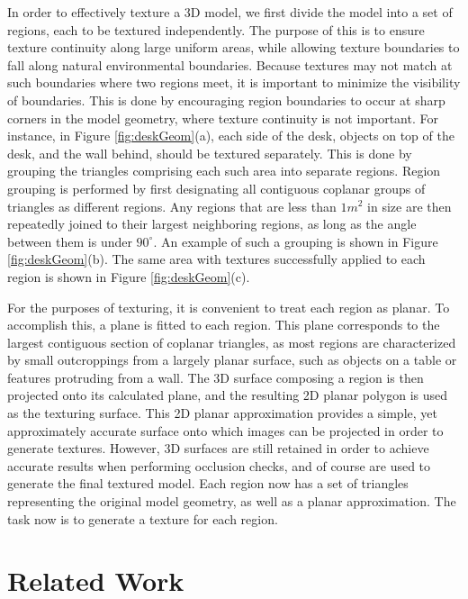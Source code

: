 \documentclass[]{spie}  %
\begin{document}
In order to effectively texture a 3D model, we first divide the model
into a set of regions, each to be textured independently. The purpose
of this is to ensure texture continuity along large uniform areas,
while allowing texture boundaries to fall along natural environmental
boundaries. Because textures may not match at such boundaries where
two regions meet, it is important to minimize the visibility of
boundaries. This is done by encouraging region boundaries to occur at
sharp corners in the model geometry, where texture continuity is not
important. For instance, in Figure \ref{fig:deskGeom}(a), each side of
the desk, objects on top of the desk, and the wall behind, should be
textured separately. This is done by grouping the triangles comprising
each such area into separate regions. Region grouping is performed by
first designating all contiguous coplanar groups of triangles as
different regions. Any regions that are less than $1 m^2$ in size are
then repeatedly joined to their largest neighboring regions, as long
as the angle between them is under $90^{\circ}$. An example of such a
grouping is shown in Figure \ref{fig:deskGeom}(b). The same area with
textures successfully applied to each region is shown in Figure
\ref{fig:deskGeom}(c).

For the purposes of texturing, it is convenient to treat each region
as planar. To accomplish this, a plane is fitted to each region. This
plane corresponds to the largest contiguous section of coplanar
triangles, as most regions are characterized by small outcroppings
from a largely planar surface, such as objects on a table or features
protruding from a wall. The 3D surface composing a region is then
projected onto its calculated plane, and the resulting 2D planar
polygon is used as the texturing surface. This 2D planar approximation
provides a simple, yet approximately accurate surface onto which
images can be projected in order to generate textures. However, 3D
surfaces are still retained in order to achieve accurate results when
performing occlusion checks, and of course are used to generate the
final textured model. Each region now has a set of triangles
representing the original model geometry, as well as a planar
approximation. The task now is to generate a texture for each region.

\section{Related Work}
\label{sec:relatedWork}
\end{document}
